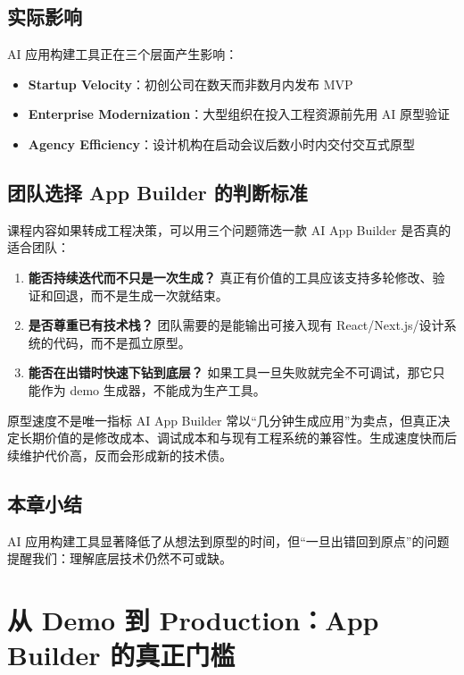 \documentclass[a4paper]{article}
\begin{document}
\subsection{实际影响}

AI 应用构建工具正在三个层面产生影响：

\begin{itemize}
    \item \textbf{Startup Velocity}：初创公司在数天而非数月内发布 MVP
    \item \textbf{Enterprise Modernization}：大型组织在投入工程资源前先用 AI 原型验证
    \item \textbf{Agency Efficiency}：设计机构在启动会议后数小时内交付交互式原型
\end{itemize}

\subsection{团队选择 App Builder 的判断标准}

课程内容如果转成工程决策，可以用三个问题筛选一款 AI App Builder 是否真的适合团队：

\begin{enumerate}
    \item \textbf{能否持续迭代而不只是一次生成？} 真正有价值的工具应该支持多轮修改、验证和回退，而不是生成一次就结束。
    \item \textbf{是否尊重已有技术栈？} 团队需要的是能输出可接入现有 React/Next.js/设计系统的代码，而不是孤立原型。
    \item \textbf{能否在出错时快速下钻到底层？} 如果工具一旦失败就完全不可调试，那它只能作为 demo 生成器，不能成为生产工具。
\end{enumerate}

\begin{warningbox}{原型速度不是唯一指标}
AI App Builder 常以“几分钟生成应用”为卖点，但真正决定长期价值的是修改成本、调试成本和与现有工程系统的兼容性。生成速度快而后续维护代价高，反而会形成新的技术债。
\end{warningbox}

\subsection{本章小结}

AI 应用构建工具显著降低了从想法到原型的时间，但``一旦出错回到原点''的问题提醒我们：理解底层技术仍然不可或缺。

\section{从 Demo 到 Production：App Builder 的真正门槛}
\end{document}
